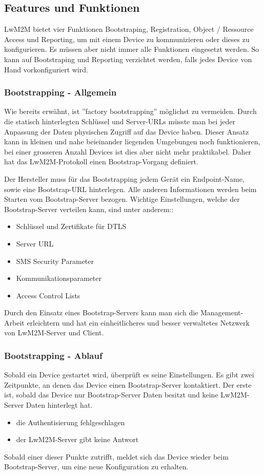 \subsection{Features und Funktionen}
LwM2M bietet vier Funktionen Bootstraping, Registration, Object / Ressource Access und Reporting, um mit einem Device zu kommunizieren oder dieses zu konfigurieren. Es müssen aber nicht immer alle Funktionen eingesetzt werden. So kann auf Bootstraping und Reporting verzichtet werden, falls jedes Device von Hand vorkonfiguriert wird.
\subsubsection{Bootstrapping - Allgemein}
Wie bereits erwähnt, ist ''factory bootstrapping'' möglichst zu vermeiden. Durch die statisch hinterlegten Schlüssel und Server-URLs müsste man bei jeder Anpassung der Daten physischen Zugriff auf das Device haben. Dieser Ansatz kann in kleinen und nahe beieinander liegenden Umgebungen noch funktionieren, bei einer grosseren Anzahl Devices ist dies aber nicht mehr praktikabel. Daher hat das LwM2M-Protokoll einen Bootstrap-Vorgang definiert.


Der Hersteller muss für das Bootstrapping jedem Gerät ein Endpoint-Name, sowie eine Bootstrap-URL hinterlegen. Alle anderen Informationen werden beim Starten vom Bootstrap-Server bezogen.
Wichtige Einstellungen, welche der Bootstrap-Server verteilen kann, sind unter anderem:\cite{BootstrapFeatures}:
\begin{itemize}
\item Schlüssel und Zertifikate für DTLS
\item Server URL
\item SMS Security Parameter
\item Kommunikationsparameter
\item Access Control Lists
\end{itemize}
Durch den Einsatz eines Bootstrap-Servers kann man sich die Management-Arbeit erleichtern und hat ein einheitlicheres und besser verwaltetes Netzwerk von LwM2M-Server und Client.
\subsubsection{Bootstrapping - Ablauf}
Sobald ein Device gestartet wird, überprüft es seine Einstellungen. Es gibt zwei Zeitpunkte, an denen das Device einen Bootstrap-Server kontaktiert. Der erste ist, sobald das Device nur Bootstrap-Server Daten besitzt und keine LwM2M-Server Daten hinterlegt hat. 
\begin{itemize}
\item die Authentisierung fehlgeschlagen
\item der LwM2M-Server gibt keine Antwort
\end{itemize}
Sobald einer dieser Punkte zutrifft, meldet sich das Device wieder beim Bootstrap-Server, um eine neue Konfiguration zu erhalten.

